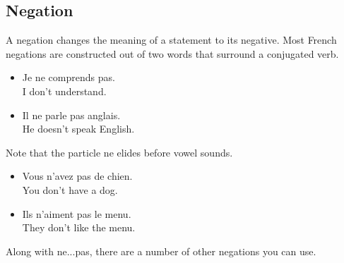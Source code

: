 \pagebreak
\subsection{Negation}

A negation changes the meaning of a statement to its negative. Most French negations are constructed out of two words that surround a conjugated verb.

\begin{itemize}
  \item  Je ne comprends pas. \\ I don't understand.
  \item  Il ne parle pas anglais. \\ He doesn't speak English.
\end{itemize}

Note that the particle ne elides before vowel sounds.

\begin{itemize}
  \item  Vous n'avez pas de chien. \\ You don't have a dog.
  \item  Ils n'aiment pas le menu. \\ They don't like the menu.
\end{itemize}


Along with ne...pas, there are a number of other negations you can use.

